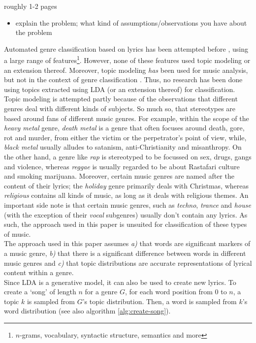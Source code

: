 roughly 1-2 pages
\begin{itemize}
\item explain the problem; what kind of assumptions/observations you have about the problem
\end{itemize}

Automated genre classification based on lyrics has been attempted before \cite{fellyrics}, using a large range of features\footnote{$n$-grams, vocabulary, syntactic structure, semantics and more}. However, none of these features used topic modeling or an extension thereof. Moreover, topic modeling \textit{has} been used for music analysis, but not in the context of genre classification \cite{lukiccomparison}. Thus, no research has been done using topics extracted using LDA (or an extension thereof) for classification. \\
Topic modeling is attempted partly because of the observations that different genres deal with different kinds of subjects. So much so, that stereotypes are based around fans of different music genres. For example, within the scope of the \textit{heavy metal} genre, \textit{death metal} is a genre that often focuses around death, gore, rot and murder, from either the victim or the perpetrator's point of view, while, \textit{black metal} usually alludes to satanism, anti-Christianity and misanthropy. On the other hand, a genre like \textit{rap} is stereotyped to be focussed on sex, drugs, gangs and violence, whereas \textit{reggae} is usually regarded to be about Rastafari culture and smoking marijuana. Moreover, certain music genres are named after the content of their lyrics; the \textit{holiday} genre primarily deals with Christmas, whereas \textit{religious} contains all kinds of music, as long as it deals with religious themes. An important side note is that certain music genres, such as \textit{techno}, \textit{trance} and \textit{house} (with the exception of their \textit{vocal} subgenres) usually don't contain any lyrics. As such, the approach used in this paper is unsuited for classification of these types of music. \\
The approach used in this paper assumes \textit{a)} that words are significant markers of a music genre, \textit{b)} that there is a significant difference between words in different music genres and \textit{c)} that topic distributions are accurate representations of lyrical content within a genre. \\
Since LDA is a generative model, it can also be used to create new lyrics. To create a `song' of length $n$ for a genre $G$, for each word position from $0$ to $n$, a topic $k$ is sampled from $G$'s topic distribution. Then, a word is sampled from $k$'s word distribution (see also algorithm \ref{alg:create-song}). \\
